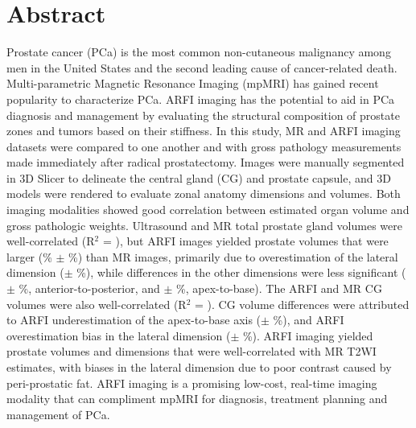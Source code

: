 \section*{Abstract}
Prostate cancer (PCa) is the most common non-cutaneous malignancy among men in
the United States and the second leading cause of cancer-related death.
Multi-parametric Magnetic Resonance Imaging (mpMRI) has gained recent
popularity to characterize PCa.  ARFI imaging has the potential to aid in PCa
diagnosis and management by evaluating the structural composition of prostate
zones and tumors based on their stiffness.  In this study, \invivo MR and ARFI
imaging datasets were compared to one another and with gross pathology
measurements made immediately after radical prostatectomy.  Images were
manually segmented in 3D Slicer to delineate the central gland (CG) and
prostate capsule, and 3D models were rendered to evaluate zonal anatomy
dimensions and volumes.  Both imaging modalities showed good correlation
between estimated organ volume and gross pathologic weights.  Ultrasound and MR
total prostate gland volumes were well-correlated (R$^2$ = \MRarfiVolTotalRsq),
but ARFI images yielded prostate volumes that were larger
(\MRarfiVolTotalMeanDiff\% $\pm$ \MRarfiVolTotalStdDiff\%) than MR images,
primarily due to overestimation of the lateral dimension
(\ARFImrTotalLatLatMeanPct $\pm$ \ARFImrTotalLatLatStdPct\%), while differences
in the other dimensions were less significant (\ARFImrTotalAntPostMeanPct $\pm$
\ARFImrTotalAntPostStdPct\%, anterior-to-posterior, and
\ARFImrTotalApexBaseMeanPct $\pm$ \ARFImrTotalApexBaseStdPct\%, apex-to-base).
The ARFI and MR CG volumes were also well-correlated (R$^2$ =
\MRarfiVolCentralRsq).  CG volume differences were attributed to
ARFI underestimation of the apex-to-base axis (\ARFImrCentralApexBaseMeanPct $\pm$
\ARFImrCentralApexBaseStdPct\%), and ARFI overestimation bias in the lateral
dimension (\ARFImrCentralLatLatMeanPct $\pm$ \ARFImrCentralLatLatStdPct\%).
ARFI imaging yielded prostate volumes and dimensions that were well-correlated
with MR T2WI estimates, with biases in the lateral dimension due to poor
contrast caused by peri-prostatic fat.  ARFI imaging is a promising low-cost,
real-time imaging modality that can compliment mpMRI for diagnosis, treatment
planning and management of PCa.
